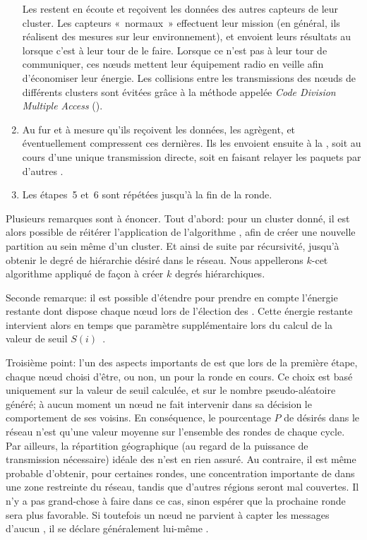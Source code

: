 \begin{enumerate}
        Les \chs restent en écoute et reçoivent les données des autres capteurs de leur cluster.
        Les capteurs «~normaux~» effectuent leur mission (en général, ils réalisent des mesures sur leur environnement), et envoient leurs résultats au \ch lorsque c'est à leur tour de le faire.
        Lorsque ce n'est pas à leur tour de communiquer, ces nœuds mettent leur équipement radio en veille afin d'économiser leur énergie.
        Les collisions entre les transmissions des nœuds de différents clusters sont évitées grâce à la méthode appelée \textit{Code Division Multiple Access} (\cdma).
    \item Au fur et à mesure qu'ils reçoivent les données, les \chs agrègent, et éventuellement compressent ces dernières.
        Ils les envoient ensuite à la \sdb, soit au cours d'une unique transmission directe, soit en faisant relayer les paquets par d'autres \chs.
    \item Les étapes~5 et~6 sont répétées jusqu'à la fin de la ronde.
\end{enumerate}

Plusieurs remarques sont à énoncer.
Tout d'abord: pour un cluster donné, il est alors possible de réitérer l'application de l'algorithme \leach, afin de créer une nouvelle partition au sein même d'un cluster.
Et ainsi de suite par récursivité, jusqu'à obtenir le degré de hiérarchie désiré dans le réseau.
Nous appellerons $k$-\leach cet algorithme appliqué de façon à créer $k$ degrés hiérarchiques.

Seconde remarque: il est possible d'étendre \leach pour prendre en compte l'énergie restante dont dispose chaque nœud lors de l'élection des \CH.
Cette énergie restante intervient alors en temps que paramètre supplémentaire lors du calcul de la valeur de seuil $S(i)$~\cite{HHT02}.

Troisième point: l'un des aspects importants de \leach est que lors de la première étape, chaque nœud choisi d'être, ou non, un \ch pour la ronde en cours.
Ce choix est basé uniquement sur la valeur de seuil calculée, et sur le nombre pseudo-aléatoire généré; à aucun moment un nœud ne fait intervenir dans sa décision le comportement de ses voisins.
En conséquence, le pourcentage $P$ de \chs désirés dans le réseau n'est qu'une valeur moyenne sur l'ensemble des rondes de chaque cycle.
Par ailleurs, la répartition géographique (au regard de la puissance de transmission nécessaire) idéale des \chs n'est en rien assuré.
Au contraire, il est même probable d'obtenir, pour certaines rondes, une concentration importante de \chs dans une zone restreinte du réseau, tandis que d'autres régions seront mal couvertes.
Il n'y a pas grand-chose à faire dans ce cas, sinon espérer que la prochaine ronde sera plus favorable.
Si toutefois un nœud ne parvient à capter les messages d'aucun \ch, il se déclare généralement lui-même \CH.


